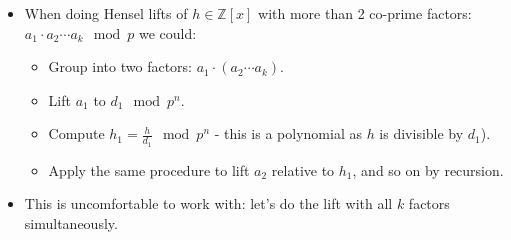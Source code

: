 \begin{frame}
\begin{itemize}
\item When doing Hensel lifts of $h\in \mathbb Z[x]$ with more than 2 co-prime factors: $a_1\cdot a_2 \cdots a_k \mod p $
we could:
\begin{itemize}
\item<2-> Group into two factors: $a_1 \cdot \left(a_2\cdots a_k\right) $.
\item<3-> Lift $a_1$ to $d_1 \mod p^n$.
\item<4-> Compute $h_1 = \frac{h}{d_1 } \mod p^n$ - this is a polynomial as $h$ is divisible by $d_1$).
\item<5-> Apply the same procedure to lift $a_2$ relative to $h_1$, and so on by recursion.
\end{itemize}
\item<6-> This is uncomfortable to work with: let's do the lift with all $k$ factors simultaneously. 
\end{itemize}
\end{frame}